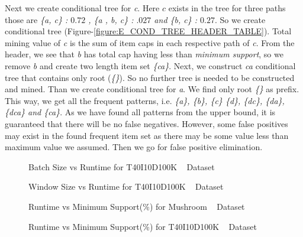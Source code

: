 \documentclass[conference]{IEEEtran}
\begin{document}
Next we create conditional tree for \emph{c}. Here $c$ exists in the tree for three paths those are \emph{\{a, c\} : $0.72$ , \{a , b, c\} : $.027$ and \{b, c\} : $0.27$}. So we create conditional tree (Figure-\ref{figure:E_COND_TREE_HEADER_TABLE}). Total mining value of \emph{c} is the sum of item caps in each respective path of \emph{c}. From the header, we see that \emph{b} has total cap having less than \emph{minimum support}, so we remove \emph{b} and create two length item set \emph{\{ca\}}. Next, we construct \emph{ca} conditional tree that contains only root (\emph{\{\}}). So no further tree is needed to be constructed and mined. Than we create conditional tree for \emph{a}. We find only root \emph{\{\}} as prefix. This way, we get all the frequent patterns, i.e. \emph{\{a\}, \{b\}, \{c\} \{d\}, \{dc\}, \{da\}, \{dca\} and \{ca\}}. As we have found all patterns from the upper bound, it is guaranteed that there will be no false negatives. However, some false positives may exist in the found frequent item set as there may be some value less than maximum value we assumed. Then we go for false positive elimination.

\begin{figure}[t]
    \begin{minipage}{0.5\linewidth}
        \centering

  		
  		\caption{Batch Size vs Runtime for T40I10D100K ~\cite{dataset} Dataset }
  		\label{result:g_t10_const_batch}
    \end{minipage}%
    \begin{minipage}{0.5\linewidth}
         \centering
  		 
  		 \caption{Window Size vs Runtime for T40I10D100K ~\cite{dataset} Dataset }
  		 \label{result:g_t10_const_win}
    \end{minipage}
\end{figure}

\begin{figure}[t]
\begin{minipage}{0.5\linewidth}
    \centering
    
    \caption{Runtime vs Minimum Support(\%) for Mushroom ~\cite{dataset} Dataset }
    \label{result:g_m_total}
\end{minipage}%
    \begin{minipage}{0.5\linewidth}
    \centering
    
    \caption{Runtime vs Minimum Support(\%) for T40I10D100K ~\cite{dataset} Dataset }
    \label{result:g_t10_total}
    \end{minipage}
\end{figure} 
\end{document}
